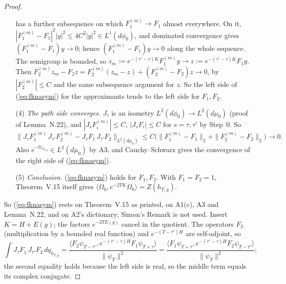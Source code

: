 \documentclass[11pt,a4paper]{article}
\newcommand{\Om}{\Omega}
\newcommand{\ip}[2]{\langle #1,#2\rangle}
\newcommand{\Uc}{\mathcal U}
\newcommand{\dmu}{d\mu_0}
\newcommand{\dphi}{d\phi_0}
\theoremstyle{plain}
\theoremstyle{definition}
\begin{document}
\begin{proof}
\begin{enumerate}
has a further subsequence on which $F_1^{(m)}\to F_1$ almost everywhere.  On it,
$|F_1^{(m)}-F_1|^2|y|^2\le4C^2|y|^2\in L^1(\dphi)$, and dominated convergence gives
$(F_1^{(m)}-F_1)y\to0$; hence $(F_1^{(m)}-F_1)y\to0$ along the whole sequence.  The semigroup
is bounded, so $z_m:=e^{-(\tau'-\tau)K}F_1^{(m)}y\to z:=e^{-(\tau'-\tau)K}F_1y$.  Then
$F_2^{(m)}z_m-F_2z=F_2^{(m)}(z_m-z)+(F_2^{(m)}-F_2)z\to0$, by $|F_2^{(m)}|\le C$ and the same
subsequence argument for $z$.  So the left side of (\ref{eq:fknasym}) for the approximants
tends to the left side for $F_1,F_2$.
\item[(4)] \emph{The path side converges.}  $J_\tau$ is an isometry
$L^2(\dphi)\to L^2(\dmu)$ (proof of Lemma~N.22), and $|J_sF_i^{(m)}|\le C$, $|J_sF_i|\le C$ for
$s=\tau,\tau'$ by Step~0.  So
\[
 \bigl\|J_\tau F_1^{(m)}\,J_{\tau'}F_2^{(m)}-J_\tau F_1\,J_{\tau'}F_2\bigr\|_{L^2(\dmu)}
 \le C\bigl(\|F_1^{(m)}-F_1\|_2+\|F_2^{(m)}-F_2\|_2\bigr)\to0 .
\]
Also $e^{-\Uc_{h_{T,g}}}\in L^2(\dmu)$ by A3, and Cauchy--Schwarz gives the convergence of the
right side of (\ref{eq:fknasym}).
\item[(5)] \emph{Conclusion.}  (\ref{eq:fknasym}) holds for $F_1,F_2$.  With $F_1=F_2=1$,
Theorem~V.15 itself gives $\ip{\Om_0}{e^{-2TK}\Om_0}=Z(h_{T,g})$.
\end{enumerate}
So (\ref{eq:fknasym}) rests on Theorem~V.15 as printed, on A1(c), A3 and Lemma~N.22, and on A2's
dictionary; Simon's Remark is not used.  Insert $K=H+E(g)$; the factors $e^{-2TE(g)}$ cancel in
the quotient.  The operators $F_2$ (multiplication by a bounded real function) and
$e^{-(T-\tau')H}$ are self-adjoint, so
\begin{equation}
 \int J_\tau F_1\,J_{\tau'}F_2\,dq_{h_{T,g}}
 =\frac{\ip{F_2\psi_{T-\tau'}}{e^{-(\tau'-\tau)H}F_1\psi_{T+\tau}}}{\|\psi_T\|^2}
 =\frac{\ip{F_1\psi_{T+\tau}}{e^{-(\tau'-\tau)H}F_2\psi_{T-\tau'}}}{\|\psi_T\|^2} ;
 \label{eq:fknbdd}
\end{equation}
the second equality holds because the left side is real, so the middle term equals its complex
conjugate.


\end{proof}
\end{document}
